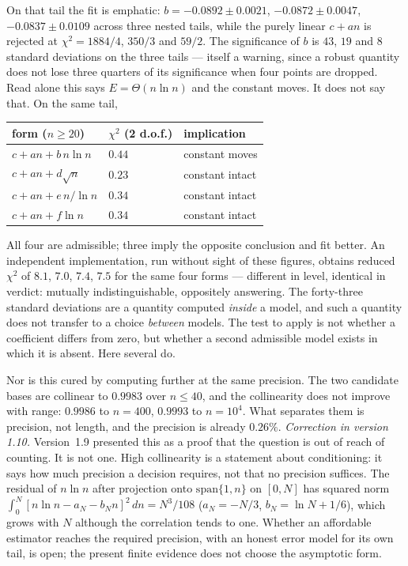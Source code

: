 \documentclass[11pt,a4paper]{article}
\begin{document}
On that tail the fit is emphatic: $b=-0.0892\pm0.0021$, $-0.0872\pm0.0047$, $-0.0837\pm0.0109$
across three nested tails, while the purely linear $c+an$ is rejected at $\chi^2=1884/4$, $350/3$
and $59/2$.  The significance of $b$ is $43$, $19$ and $8$ standard deviations on the
three tails --- itself a warning, since a robust quantity does not lose three quarters of its
significance when four points are dropped.  Read alone this says $E=\Theta(n\ln n)$ and the constant
moves.  It does not say that.  On the same tail,
\begin{center}
\begin{tabular}{lll}
\toprule
form ($n\ge20$) & $\chi^2$ (2 d.o.f.) & implication\\
\midrule
$c+an+b\,n\ln n$ & $0.44$ & constant moves\\
$c+an+d\sqrt n$ & $0.23$ & constant intact\\
$c+an+e\,n/\ln n$ & $0.34$ & constant intact\\
$c+an+f\ln n$ & $0.34$ & constant intact\\
\bottomrule
\end{tabular}
\end{center}
All four are admissible; three imply the opposite conclusion and fit better.  An independent
implementation, run without sight of these figures, obtains reduced $\chi^2$ of $8.1$, $7.0$,
$7.4$, $7.5$ for the same four forms --- different in level, identical in verdict: mutually
indistinguishable, oppositely answering.  The forty-three
standard deviations are a quantity computed \emph{inside} a model, and such a quantity does not
transfer to a choice \emph{between} models.  The test to apply is not whether a coefficient
differs from zero, but whether a second admissible model exists in which it is absent.  Here
several do.

Nor is this cured by computing further at the same precision.  The two candidate bases are collinear to $0.9983$ over
$n\le40$, and the collinearity does not improve with range: $0.9986$ to $n=400$, $0.9993$ to
$n=10^4$.  What separates them is precision, not length, and the precision is already $0.26\%$.
\emph{Correction in version 1.10.}  Version~1.9 presented this as a proof that the question is out
of reach of counting.  It is not one.  High collinearity is a statement about conditioning: it says
how much precision a decision requires, not that no precision suffices.  The residual of $n\ln n$
after projection onto $\mathrm{span}\{1,n\}$ on $[0,N]$ has squared norm $\int_0^N[n\ln n-a_N-b_Nn]^2\,dn=N^3/108$
($a_N=-N/3$, $b_N=\ln N+1/6$), which grows with $N$ although the correlation tends to one.
Whether an affordable estimator reaches the required precision, with an honest error model for its
own tail, is open; the present finite evidence does not choose the asymptotic form.
\end{document}
